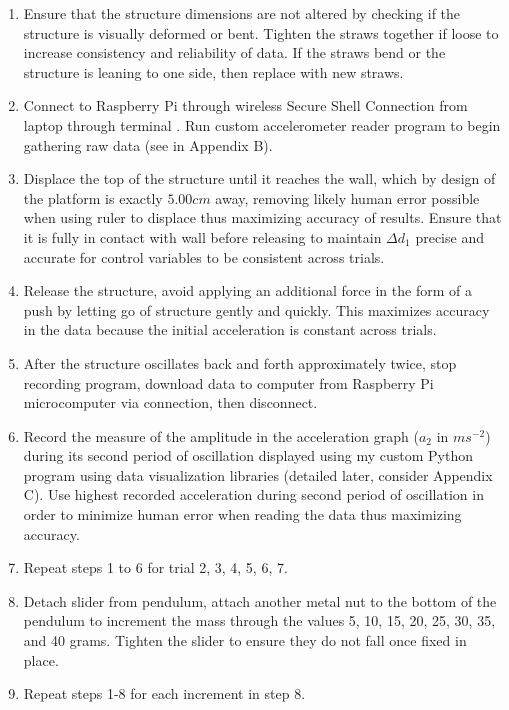 \documentclass[11pt]{article}
\begin{document}
\begin{enumerate}

\item Ensure that the structure dimensions are not altered by checking if the structure is visually deformed or bent. Tighten the straws together if loose to increase consistency and reliability of data. If the straws bend or the structure is leaning to one side, then replace with new straws.
\item Connect to Raspberry Pi through wireless Secure Shell Connection from laptop through terminal \autocite{ssh}. Run custom accelerometer reader program to begin gathering raw data (see in Appendix B).  
\item Displace the top of the structure until it reaches the wall, which by design of the platform is exactly $5.00cm$ away, removing likely human error possible when using ruler to displace thus maximizing accuracy of results. Ensure that it is fully in contact with wall before releasing to maintain $\Delta d_1$ precise and accurate for control variables to be consistent across trials. 

\item Release the structure, avoid applying an additional force in the form of a push by letting go of structure gently and quickly. This maximizes accuracy in the data because the initial acceleration is constant across trials. 
\item After the structure oscillates back and forth approximately twice, stop recording program, download data to computer from Raspberry Pi microcomputer via connection, then disconnect.
\item Record the measure of the amplitude in the acceleration graph ($a_2$ in $ms^{-2}$) during its second period of oscillation displayed using my custom Python program using data visualization libraries (detailed later, consider Appendix C). Use highest recorded acceleration during second period of oscillation in order to minimize human error when reading the data thus maximizing accuracy.
\item Repeat steps 1 to 6 for trial 2, 3, 4, 5, 6, 7. 
\item Detach slider from pendulum, attach another metal nut to the bottom of the pendulum to increment the mass through the values 5, 10, 15, 20, 25, 30, 35, and 40 grams. Tighten the slider to ensure they do not fall once fixed in place.
\item Repeat steps 1-8 for each increment in step 8. 

\end{enumerate}
\end{document}
